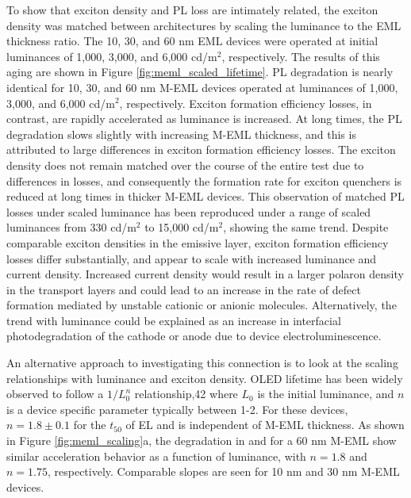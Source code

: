 \documentclass[../thesis.tex]{subfiles}
\begin{document}
To show that exciton density and PL loss are intimately related, the exciton density was matched between architectures by scaling the luminance to the EML thickness ratio.  
The 10, 30, and 60 nm EML devices were operated at initial luminances of 1,000, 3,000, and 6,000 cd/m$^2$, respectively.
The results of this aging are shown in Figure \ref{fig:meml_scaled_lifetime}.
PL degradation is nearly identical for 10, 30, and 60 nm M-EML devices operated at luminances of 1,000, 3,000, and 6,000 cd/m$^2$, respectively. 
Exciton formation efficiency losses, in contrast, are rapidly accelerated as luminance is increased. 
At long times, the PL degradation slows slightly with increasing M-EML thickness, and this is attributed to large differences in exciton formation efficiency losses. 
The exciton density does not remain matched over the course of the entire test due to differences in \ef losses, and consequently the formation rate for exciton quenchers is reduced at long times in thicker M-EML devices. 
This observation of matched PL losses under scaled luminance has been reproduced under a range of scaled luminances from 330 cd/m$^2$ to 15,000 cd/m$^2$, showing the same trend. 
Despite comparable exciton densities in the emissive layer, exciton formation efficiency losses differ substantially, and appear to scale with increased luminance and current density. 
Increased current density would result in a larger polaron density in the transport layers and could lead to an increase in the rate of defect formation mediated by unstable cationic or anionic molecules.
Alternatively, the trend with luminance could be explained as an increase in interfacial photodegradation of the cathode or anode due to device electroluminescence.\supercite{Wang2012,Wang2010a}



An alternative approach to investigating this connection is to look at the scaling relationships with luminance and exciton density.
OLED lifetime has been widely observed to follow a $1/L_0^n$ relationship,42 where $L_0$ is the initial luminance, and $n$ is a device specific parameter typically between 1-2. 
For these devices, $n = 1.8 \pm 0.1$ for the $t_{50}$ of EL and is independent of M-EML thickness. 
As shown in Figure \ref{fig:meml_scaling}a, the degradation in \pl and \ef for a 60 nm M-EML show similar acceleration behavior as a function of luminance, with $n = 1.8$ and $n = 1.75$, respectively. 
Comparable slopes are seen for 10 nm and 30 nm M-EML devices. 
\end{document}
